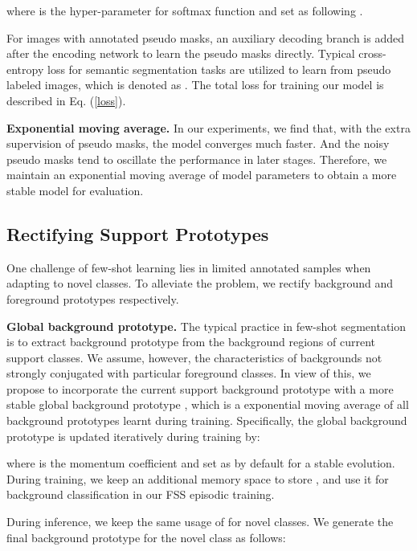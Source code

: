 \documentclass[10pt,twocolumn,letterpaper]{article}
\begin{document}
where  is the hyper-parameter for softmax function and set as  following \cite{wang2019panet}.

For images with annotated pseudo masks, an auxiliary decoding branch is added after the encoding network to learn the pseudo masks directly. Typical cross-entropy loss for semantic segmentation tasks are utilized to learn from pseudo labeled images, which is denoted as . The total loss for training our model is described in Eq. (\ref{loss}).

\textbf{Exponential moving average.}
In our experiments, we find that, with the extra supervision of pseudo masks, the model converges much faster. And the noisy pseudo masks tend to oscillate the performance in later stages. Therefore, we maintain an exponential moving average of model parameters \cite{tarvainen2017mean} to obtain a more stable model for evaluation. 


\subsection{Rectifying Support Prototypes}

One challenge of few-shot learning lies in limited annotated samples when adapting to novel classes. To alleviate the problem, we rectify background and foreground prototypes respectively. 

\vspace{0.2cm}
\noindent
\textbf{Global background prototype.}
The typical practice in few-shot segmentation is to extract background prototype from the background regions of current support classes. We assume, however, the characteristics of backgrounds not strongly conjugated with particular foreground classes. In view of this, we propose to incorporate the current support background prototype  with a more stable global background prototype , which is a exponential moving average of all background prototypes learnt during training. Specifically, the global background prototype is updated iteratively during training by:
\vspace{-0.05cm}

where  is the momentum coefficient and set as  by default for a stable evolution. During training, we keep an additional memory space to store , and use it for background classification in our FSS episodic training. 

During inference, we keep the same usage of  for novel classes. We generate the final background prototype for the novel class as follows:
\vspace{-0.05cm}
\end{document}
